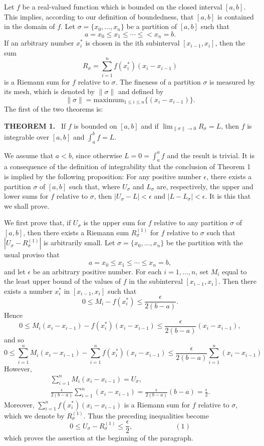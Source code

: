 Let $f$ be a real-valued function which is bounded on the closed interval $[a, b]$. This implies, according to our definition of boundedness, that $[a, b]$ is contained in the domain of $f$. Let $\sigma = \{x_0, . . ., x_n \}$ be a partition of $[a, b]$ such that
$$
a = x_0 \leq x_1 \leq  \cdots \leq < x_n = b.
$$
If an arbitrary number $x_i^*$ is chosen in the ith subinterval $[x_{i-1}, x_i]$, then the sum  
$$
R_\sigma = \sum_{i=1}^n f(x_i^*)(x_i - x_{i-1}) 
$$
is a Riemann sum for $f$ relative to $\sigma$. The fineness of a partition $\sigma$ is measured by its mesh, which is denoted by $\|\sigma\|$ and defined by
$$
\|\sigma\| = \mbox{maximum}_{1 \leq i \leq n} \{(x_i - x_{i-1}) \}. 
$$
The first of the two theorems is:
\medskip

\noindent \textbf{THEOREM 1.}~ If $f$ is bounded on $[a, b]$ and if $\lim_{\| \sigma \| \rightarrow 0} R_\sigma = L$, then $f$ is integrable over $[a, b]$ and $\int_a^b f = L$.   


\proof  We assume that $a < b$, since otherwise $L = 0 = \int_a^a f$ and the result is trivial. It is a consequence of the definition of integrability that the conclusion of Theorem 1 is implied by the following proposition: For any positive number $\epsilon $, there exists a partition $\sigma$ of $[a, b]$ such that, where $U_\sigma $ and $L_\sigma$ are, respectively, the upper and lower sums for $f$ relative to $\sigma$, then $|U_\sigma - L | < \epsilon$ and $|L - L_\sigma| < \epsilon$. It is this that we shall prove.

We first prove that, if $U_\sigma$ is the upper sum for $f$ relative to any partition $\sigma$ of $[a, b]$, then there exists a Riemann sum $R_\sigma^{(1)}$ for $f$ relative to $\sigma$ such that $| U_\sigma - R_\sigma^{(1)} |$ is arbitrarily small. Let $\sigma = \{ x_0, . . ., x_n \}$ be the partition with the usual proviso that 
$$
a = x_0 \leq x_1 \leq \cdots \leq x_n = b, 
$$
and let $\epsilon$ be an arbitrary positive number. For each $i = 1, . . ., n$, set $M_i$ equal to the least upper bound of the values of $f$ in the subinterval $[x_{i-1}, x_i]$. Then there exists a number $x_i^*$ in $[x_{i-1}, x_i]$ such that 
$$
0 \leq M_i - f(x_i^*) \leq \frac{\epsilon}{2(b - a)} .
$$ 
Hence
$$
0 \leq M_i (x_i - x_{i-1}) - f(x_i^*)(x_i - x_{i-1}) \leq \frac{\epsilon}{2(b - a)} (x_i - x_{i-1}) , 
$$
and so
$$
0 \leq \sum_{i=1}^n M_i (x_i - x_{i-1}) - \sum_{i=1}^n f(x_i^*)(x_i - x_{i-1}) \leq \frac{\epsilon}{2(b - a)} \sum_{i=1}^n (x_i - x_{i-1})
$$
However, 
\begin{eqnarray*}
\sum_{i=1}^n M_i (x_i - x_{i-1}) = U_\sigma , \\
\frac{\epsilon}{2 (b - a)} \sum_{i=1}^n (x_i - x_{i-1}) = \frac{\epsilon}{2(b - a)} (b - a) = \frac{\epsilon}{2} . 
\end{eqnarray*}
Moreover, $\sum_{i=1}^n f(x_i^*)(x_i - x_{i-1})$ is a Riemann sum for $f$ relative to $\sigma$, which we denote by $R_\sigma^{(1)}$. Thus the preceding inequalities become
$$
0 \leq U_\sigma - R_\sigma^{(1)} \leq \frac{\epsilon}{2},  \hspace{1in}( 1 )
$$
which proves the assertion at the beginning of the paragraph.

